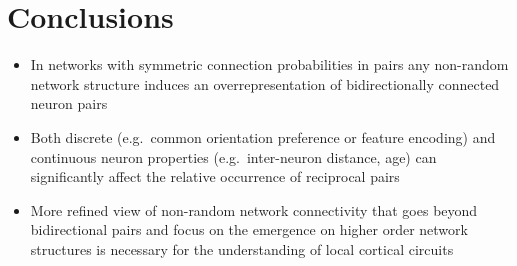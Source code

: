 \section*{Conclusions}

\begin{itemize}
  \item In networks with symmetric connection probabilities in pairs any non-random network structure induces an overrepresentation of bidirectionally connected neuron pairs
  \item Both discrete (e.g.~common orientation preference or feature encoding) and continuous neuron properties (e.g.~inter-neuron distance, age) can significantly affect the relative occurrence of reciprocal pairs
  \item More refined view of non-random network connectivity that goes beyond bidirectional pairs and focus on the emergence on higher order network structures is necessary for the understanding of local cortical circuits
\end{itemize}

